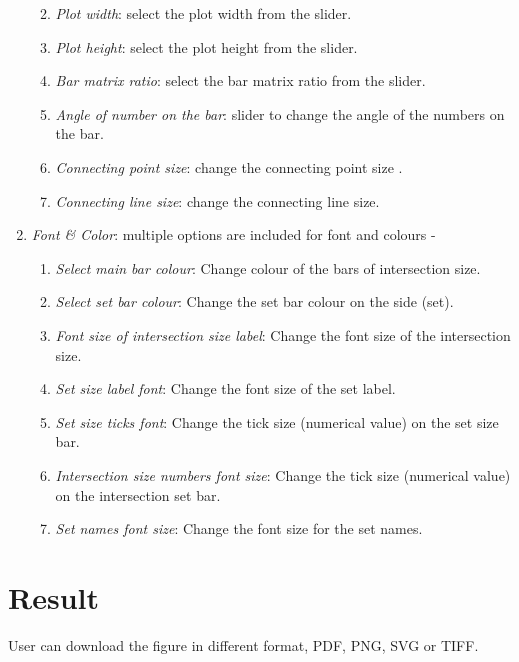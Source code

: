 \documentclass[
  a4paper,
  DIV=11,
  numbers=noendperiod,
  oneside,
  open=any]{scrreport}
\begin{document}
\begin{enumerate}
  \begin{enumerate}
  \def\labelenumii{\roman{enumii}.}
  \setcounter{enumii}{6}
  \item
    \emph{Plot width}: select the plot width from the slider.
  \item
    \emph{Plot height}: select the plot height from the slider.
  \item
    \emph{Bar matrix ratio}: select the bar matrix ratio from the
    slider.
  \item
    \emph{Angle of number on the bar}: slider to change the angle of the
    numbers on the bar.
  \item
    \emph{Connecting point size}: change the connecting point size .
  \item
    \emph{Connecting line size}: change the connecting line size.
  \end{enumerate}
\item
  \emph{Font \& Color}: multiple options are included for font and
  colours -

  \begin{enumerate}
  \def\labelenumii{\roman{enumii}.}
  \item
    \emph{Select main bar colour}: Change colour of the bars of
    intersection size.
  \item
    \emph{Select set bar colour}: Change the set bar colour on the side
    (set).
  \item
    \emph{Font size of intersection size label}: Change the font size of
    the intersection size.
  \item
    \emph{Set size label font}: Change the font size of the set label.
  \item
    \emph{Set size ticks font}: Change the tick size (numerical value)
    on the set size bar.
  \item
    \emph{Intersection size numbers font size}: Change the tick size
    (numerical value) on the intersection set bar.
  \item
    \emph{Set names font size}: Change the font size for the set names.
  \end{enumerate}
\end{enumerate}

\section{Result}\label{result}

User can download the figure in different format, PDF, PNG, SVG or TIFF.
\end{document}
